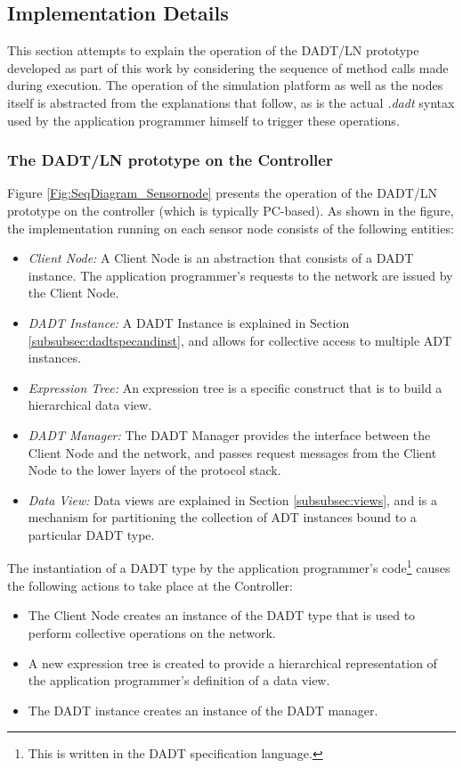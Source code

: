 \subsection{Implementation Details}

This section attempts to explain the operation of the DADT/LN prototype
developed as part of this work by considering the sequence of method calls made
during execution. The operation of the simulation platform as well as the
nodes itself is abstracted from the explanations that follow, as is the actual
\emph{.dadt} syntax used by the application programmer himself to trigger these
operations. 

\subsubsection{The DADT/LN prototype on the Controller}

Figure \ref{Fig:SeqDiagram_Sensornode} presents the operation of the DADT/LN
prototype on the controller (which is typically PC-based). As shown in the figure, the implementation running on each sensor node 
consists of the following entities:

\begin{itemize}
  \item \emph{Client Node:} A Client Node is an abstraction that consists of a
  DADT instance. The application programmer's requests to the network are issued
  by the Client Node.
  \item \emph{DADT Instance:} A DADT Instance is explained in Section
  \ref{subsubsec:dadtspecandinst}, and allows for collective access to multiple
  ADT instances.
  \item \emph{Expression Tree:} An expression tree is a specific construct that is to
  build a hierarchical data view.
  \item \emph{DADT Manager:} The DADT Manager provides the interface between the
  Client Node and the network, and passes request messages from the Client Node
  to the lower layers of the protocol stack.
  \item \emph{Data View:} Data views are explained in Section
  \ref{subsubsec:views}, and is a mechanism for partitioning the collection of
  ADT instances bound to a particular DADT type.
\end{itemize}

The instantiation of a DADT type by the application programmer's
code\footnote{This is written in the DADT specification language.} causes the
following actions to take place at the Controller:
\begin{itemize}
  \item The Client Node creates an instance of the DADT type that is used to perform
collective operations on the network.  
\item A new expression tree is created to provide a hierarchical representation
of the application programmer's definition of a data view.
\item The DADT instance creates an instance of the DADT manager.
\end{itemize}

